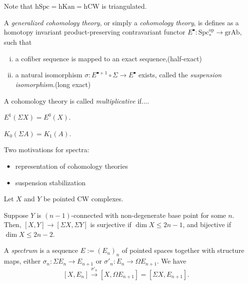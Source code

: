 \documentclass{../../large}
\begin{document}
\chapter{}
\begin{prb}

Note that $\mathrm{hSpc}=\mathrm{hKan}=\mathrm{hCW}$ is triangulated.


\end{prb}
\begin{prb}
A \emph{generalized cohomology theory}, or simply a \emph{cohomology theory}, is defines as a homotopy invariant product-preserving contravariant functor $E^\bullet:\mathrm{Spc}_*^\mathrm{op}\to\mathrm{grAb}$, such that
\begin{enumerate}[(i)]
\item a cofiber sequence is mapped to an exact sequence,\hfill(half-exact)
\item a natural isomorphism $\sigma:E^{\bullet+1}\circ\Sigma\to E^\bullet$ exists, called the \emph{suspension isomorphism}.\hfill(long exact)
\end{enumerate}
A cohomology theory is called \emph{multiplicative} if....

$E^1(\Sigma X)=E^0(X)$.

$K_0(\Sigma A)=K_1(A)$.
\end{prb}





Two motivations for spectra:
\begin{itemize}
\item representation of cohomology theories
\item suspension stabilization
\end{itemize}


\begin{prb}
Let $X$ and $Y$ be pointed CW complexes.
\begin{parts}
\item Suppose $Y$ is $(n-1)$-connected with non-degenerate base point for some $n$. Then, $[X,Y]\to[\Sigma X,\Sigma Y]$ is surjective if $\dim X\le 2n-1$, and bijective if $\dim X\le2n-2$.
\end{parts}
\end{prb}



\begin{prb}
A \emph{spectrum} is a sequence $E:=(E_n)_n$ of pointed spaces together with structure maps, either $\sigma_n:\Sigma E_n\to E_{n+1}$ or $\sigma'_n:E_n\to\Omega E_{n+1}$.
We have
\[[X,E_n]\xrightarrow{\sigma'_n}[X,\Omega E_{n+1}]=[\Sigma X,E_{n+1}].\]
\end{prb}
\end{document}
